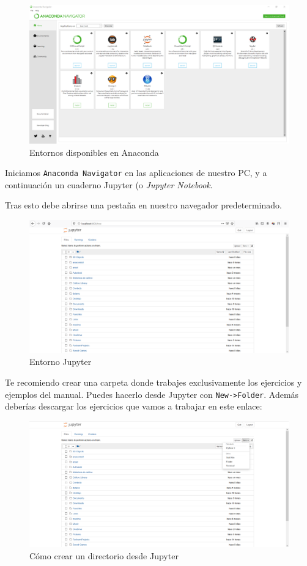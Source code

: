 \documentclass[openany,a4paper]{book}
\begin{document}
\begin{figure}[H]
    \centering
    \includegraphics[width=0.618\linewidth]{images/screenshots/anaconda/anaconda_in.png}
    \caption{Entornos disponibles en Anaconda}
\end{figure}

Iniciamos \texttt{Anaconda Navigator} en las aplicaciones de nuestro PC, y a continuación un cuaderno Jupyter (o \textit{Jupyter Notebook}.

Tras esto debe abrirse una pestaña en nuestro navegador predeterminado.

\begin{figure}[H]
    \centering
    \includegraphics[width=0.618\linewidth]{images/screenshots/jupyter/jupyter_init.png}
    \caption{Entorno Jupyter}
\end{figure}

Te recomiendo crear una carpeta donde trabajes exclusivamente los ejercicios y ejemplos del manual. Puedes hacerlo desde Jupyter con \texttt{New->Folder}. Además deberías descargar los ejercicios que vamos a trabajar en este enlace:

\begin{figure}[H]
    \centering
    \includegraphics[width=0.618\linewidth]{images/screenshots/jupyter/jupyter_init_new_folder.png}
    \caption{Cómo crear un directorio desde Jupyter}
\end{figure}
\end{document}
